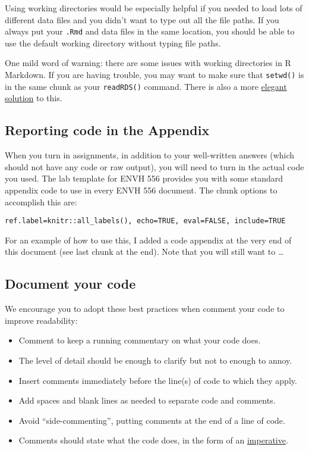 \documentclass[
]{article}
\providecommand{\tightlist}{%
  \setlength{\itemsep}{0pt}\setlength{\parskip}{0pt}}
\begin{document}
Using working directories would be especially helpful if you needed to
load lots of different data files and you didn't want to type out all
the file paths. If you always put your \texttt{.Rmd} and data files in
the same location, you should be able to use the default working
directory without typing file paths.

One mild word of warning: there are some issues with working directories
in R Markdown. If you are having trouble, you may want to make sure that
\texttt{setwd()} is in the same chunk as your \texttt{readRDS()}
command. There is also a more
\href{http://pbahr.github.io/tips/2016/04/16/fix_rmarkdown_working_directory_issue}{elegant
solution} to this.

\hypertarget{reporting-code-in-the-appendix}{%
\subsection{Reporting code in the
Appendix}\label{reporting-code-in-the-appendix}}

When you turn in assignments, in addition to your well-written answers
(which should not have any code or raw output), you will need to turn in
the actual code you used. The lab template for ENVH 556 provides you
with some standard appendix code to use in every ENVH 556 document. The
chunk options to accomplish this are:

\begin{verbatim}
ref.label=knitr::all_labels(), echo=TRUE, eval=FALSE, include=TRUE
\end{verbatim}

For an example of how to use this, I added a code appendix at the very
end of this document (see last chunk at the end). Note that you will
still want to \ldots{}

\hypertarget{document-your-code}{%
\subsection{Document your code}\label{document-your-code}}

We encourage you to adopt these best practices when comment your code to
improve readability:

\begin{itemize}
\tightlist
\item
  Comment to keep a running commentary on what your code does.
\item
  The level of detail should be enough to clarify but not to enough to
  annoy.
\item
  Insert comments immediately before the line(s) of code to which they
  apply.
\item
  Add spaces and blank lines as needed to separate code and comments.
\item
  Avoid ``side-commenting'', putting comments at the end of a line of
  code.
\item
  Comments should state what the code does, in the form of an
  \href{https://www.wordnik.com/words/imperative}{imperative}.
\end{itemize}
\end{document}
